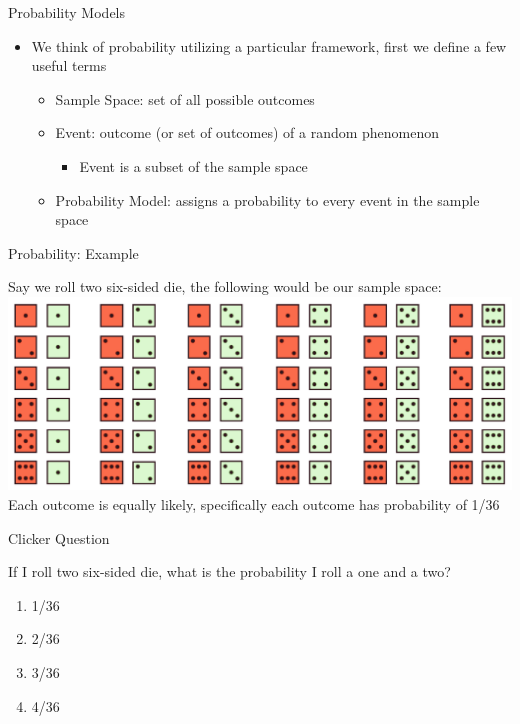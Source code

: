 \documentclass{beamer}
\begin{document}
\begin{frame}{Probability Models}
	
	\begin{itemize}
		\item We think of probability utilizing a particular framework, first we define a few useful terms
		      \begin{itemize}
		      	\item \alert{Sample Space}: set of all possible outcomes
		      	\item \alert{Event}: outcome (or set of outcomes) of a random phenomenon
		      	      \begin{itemize}
		      	      	\item Event is a subset of the sample space
		      	      \end{itemize}
		      	\item \alert{Probability Model}: assigns a probability to every event in the sample space
		      \end{itemize}
	\end{itemize}
	
\end{frame}



\begin{frame}{Probability: Example}
	
	Say we roll two six-sided die, the following would be our sample space: 
	\includegraphics[width=\textwidth]{twodiesamplespace}
	\\
	Each outcome is equally likely, specifically each outcome has probability of 1/36
	
\end{frame}

\begin{frame}{Clicker Question}
	
	If I roll two six-sided die, what is the probability I roll a one and a two?
	\begin{enumerate}[label=(\alph*)]
		\item 1/36
		\item 2/36
		\item 3/36
		\item 4/36
	\end{enumerate}
	
\end{frame}
\end{document}
